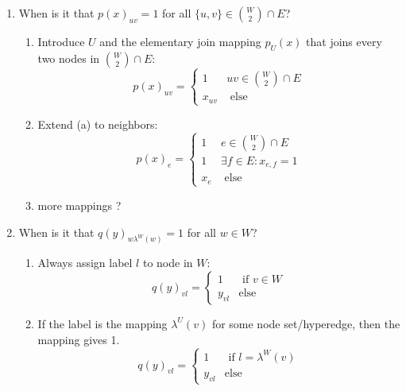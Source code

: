 \begin{enumerate}
    \item When is it that $p(x)_{uv}=1$ for all $\{u,v\} \in \binom{W}{2} \cap E$? 
    \begin{enumerate}
        \item Introduce $U$ and the elementary join mapping $p_U(x)$ that joins every two nodes in $\binom{W}{2} \cap E$:
        \begin{equation}
            p(x)_{uv} = \begin{cases}
            1 & uv \in \binom{W}{2} \cap E \\
            x_{uv} & \text{ else} 
            \end{cases}
        \end{equation}
        \item Extend (a) to neighbors:
        \begin{equation}
            p(x)_{e} = \begin{cases}
            1 & e \in \binom{W}{2} \cap E \\
            1 & \exists f \in E: x_{e,f}=1  \\
            x_{e} & \text{ else} 
            \end{cases}
        \end{equation}
        \item more mappings ? 
    \end{enumerate}
    \item When is it that $q(y)_{w \lambda^W(w)}=1$ for all $w\in W$? 
    \begin{enumerate}
    \item Always assign label $l$ to node in $W$:
            \begin{equation} q(y)_{vl}= \begin{cases}
            1 & \text{ if } v \in W \\
            y_{vl} & \text{else}
            \end{cases}
            \end{equation}
     \item If the label is the mapping $\lambda^U(v)$ for some node set/hyperedge, then the mapping gives 1. 
            \begin{equation} q(y)_{vl}= \begin{cases}
            1 & \text{ if } l=\lambda^W(v) \\
            y_{vl} & \text{else}
            \end{cases}
            \end{equation}
    

\end{enumerate}
\end{enumerate}

